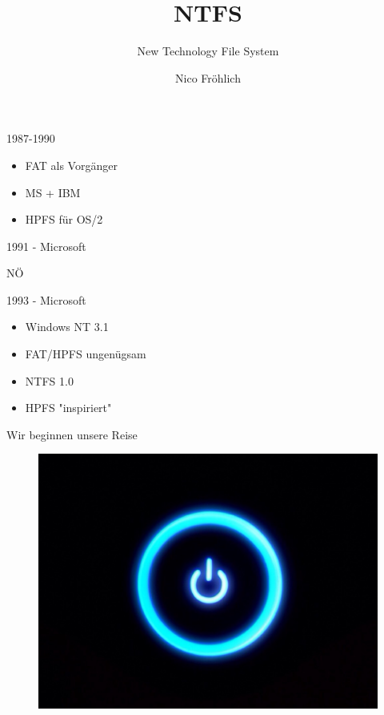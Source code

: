\documentclass[12pt]{beamer}
\author{Nico Fröhlich}
\title{NTFS}
\subtitle{New Technology File System}
\begin{document}
\begin{frame}
\maketitle
\end{frame}

\begin{frame}{1987-1990}
\begin{itemize}
\item FAT als Vorgänger
\item MS + IBM
\item HPFS für OS/2
\end{itemize}
\end{frame}

\begin{frame}{1991 - Microsoft}
\begin{center}
\fontsize{48pt}{48pt}\selectfont
NÖ
\end{center}
\end{frame}

\begin{frame}{1993 - Microsoft}
\begin{itemize}
\item Windows NT 3.1
\item FAT/HPFS ungenügsam
\item NTFS 1.0
\item HPFS "inspiriert"
\end{itemize}
\end{frame}

\begin{frame}{Wir beginnen unsere Reise}
\begin{figure}
\includegraphics[scale=0.25]{switch.jpg}
\end{figure}
\end{frame}
\end{document}
